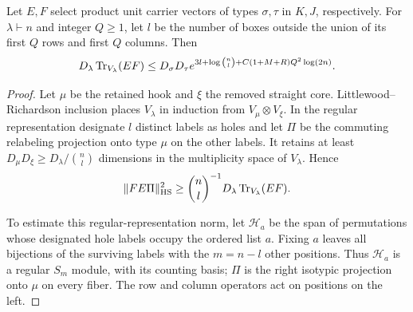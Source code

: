 \begin{proposition}
\label{prop:coherent-restoration}
Let $E,F$ select product unit carrier vectors of types $\sigma,\tau$
in $K,J$, respectively.  For $\lambda\vdash n$ and integer $Q\ge1$,
let $l$ be the number of boxes outside the union of its first $Q$
rows and first $Q$ columns.  Then
\begin{equation}\label{rec:coherent-general-grid}
 D_\lambda\operatorname{Tr}_{V_\lambda}(EF)
 \le D_\sigma D_\tau
 e^{3l+\log\binom nl+C(1+M+R)Q^2\log(2n)}.
\end{equation}
\end{proposition}

\begin{proof}
Let $\mu$ be the retained hook and $\xi$ the removed straight core.
Littlewood--Richardson inclusion places $V_\lambda$ in induction
from $V_\mu\otimes V_\xi$.
In the regular representation designate $l$ distinct labels as holes
and let $\Pi$ be the commuting relabeling projection onto type $\mu$
on the other labels.  It retains at least
$D_\mu D_\xi\ge D_\lambda/\binom nl$ dimensions in the multiplicity
space of $V_\lambda$.  Hence
\begin{equation}\label{rec:coherent-hole-lower}
 \|FE\Pi\|_{\mathrm{HS}}^2\ge
       \binom nl^{-1}D_\lambda\operatorname{Tr}_{V_\lambda}(EF).
\end{equation}

To estimate this regular-representation norm, let $\mathcal H_a$
be the span of permutations whose designated hole labels occupy
the ordered list $a$.  Fixing $a$ leaves all bijections of the
surviving labels with the $m=n-l$ other positions.  Thus
$\mathcal H_a$ is a regular $S_m$ module, with its counting basis;
$\Pi$ is the right isotypic projection onto $\mu$ on every fiber.
The row and column operators act on positions on the left.


\end{proof}
